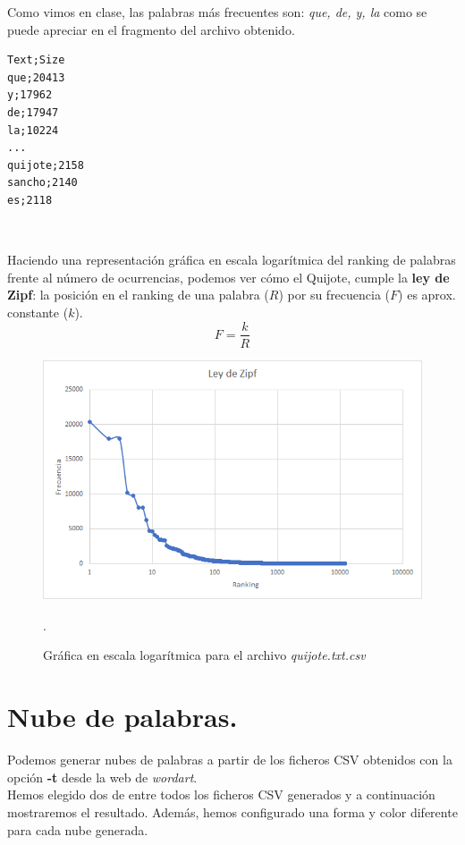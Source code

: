\documentclass[12pt]{article}
\begin{document}
Como vimos en clase, las palabras más frecuentes son: \textit{que, de, y, la} como se puede apreciar en el fragmento del archivo obtenido.\\

\begin{lstlisting}
Text;Size
que;20413
y;17962
de;17947
la;10224
...
quijote;2158
sancho;2140
es;2118
\end{lstlisting}\

Haciendo una representación gráfica en escala logarítmica del ranking de palabras frente al número de ocurrencias, podemos ver cómo el Quijote, cumple la \textbf{ley de Zipf}: la posición en el ranking de una palabra ($R$) por su frecuencia ($F$) es aprox. constante ($k$). \cite{ziki}$$F=\frac{k}{R}$$

\begin{figure}[h]
\centering
\includegraphics[scale=0.74]{Zipf.png}
\caption{Gráfica en escala logarítmica para el archivo \textit{quijote.txt.csv}}.
\label{zipf}
\end{figure}


\section{Nube de palabras.}

Podemos generar nubes de palabras a partir de los ficheros CSV obtenidos con la opción \textbf{-t} desde la web de \textit{wordart}. \cite{Nube}\\

Hemos elegido dos de entre todos los ficheros CSV generados y a continuación mostraremos el resultado. Además, hemos configurado una forma y color diferente para cada nube generada.\\
\end{document}
